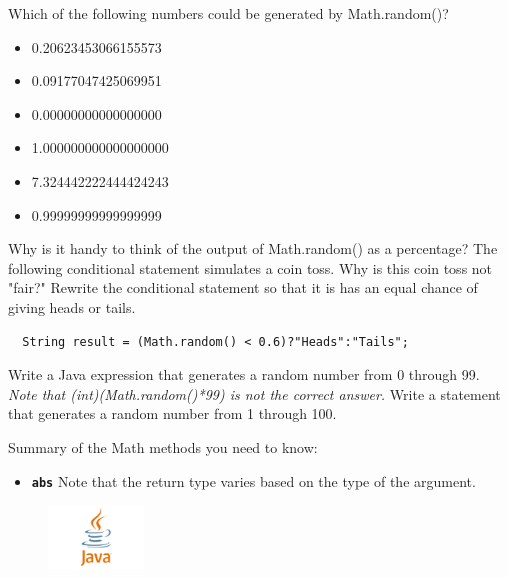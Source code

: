 \documentclass[letterpaper,11pt]{exam}
\begin{document}
\begin{questions}
\question Which of the following numbers could be generated by Math.random()?
\begin{itemize}
  \item  0.20623453066155573
  \item  0.09177047425069951
  \item  0.00000000000000000
  \item 1.000000000000000000
  \item 7.324442222444424243
  \item  0.99999999999999999
\end{itemize}
\question Why is it handy to think of the output of Math.random() as a percentage?
\question The following conditional statement simulates a coin toss.  Why is this coin toss not "fair?"  Rewrite the conditional statement so that it is has an equal chance of giving heads or tails.
\begin{verbatim}
  String result = (Math.random() < 0.6)?"Heads":"Tails";
\end{verbatim}
\vspace{1cm}
\question Write a Java expression that generates a random number from 0 through 99.  \textit{Note that (int)(Math.random()*99) is not the correct answer.}
\vspace{1cm}
\question Write a statement that generates a random number from 1 through 100.
\vspace{1cm}

\begin{samepage}
Summary of the Math methods you need to know:
\begin{itemize}
  \item \texttt{\textbf{abs}}  Note that the return type varies based on the type of the argument.
\end{itemize}
\end{samepage}
 
\end{questions}
\begin{figure}[b]\label{end}
	\center
	\includegraphics[width=1in]{java}
\end{figure}
\end{document}
